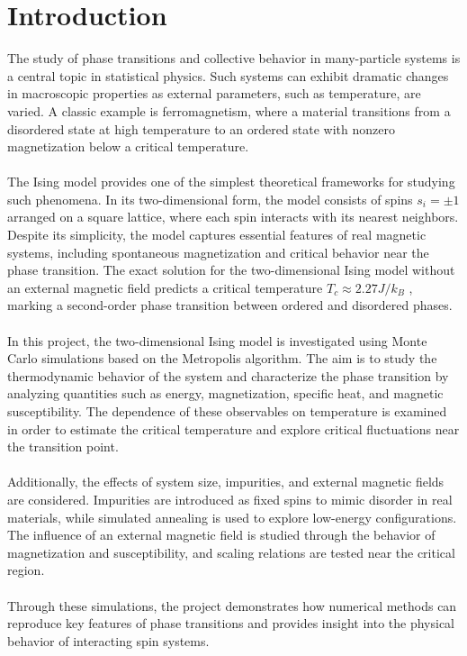 \section{Introduction}


The study of phase transitions and collective behavior in many-particle systems is a central topic in statistical physics. Such systems can exhibit dramatic changes in macroscopic properties as external parameters, such as temperature, are varied. A classic example is ferromagnetism, where a material transitions from a disordered state at high temperature to an ordered state with nonzero magnetization below a critical temperature.
\\ \\
The Ising model provides one of the simplest theoretical frameworks for studying such phenomena. In its two-dimensional form, the model consists of spins 
$ s_i = \pm 1$
arranged on a square lattice, where each spin interacts with its nearest neighbors. Despite its simplicity, the model captures essential features of real magnetic systems, including spontaneous magnetization and critical behavior near the phase transition. The exact solution for the two-dimensional Ising model without an external magnetic field predicts a critical temperature 
$T_c \approx 2.27 J/k_B$
, marking a second-order phase transition between ordered and disordered phases.
\\ \\
In this project, the two-dimensional Ising model is investigated using Monte Carlo simulations based on the Metropolis algorithm. The aim is to study the thermodynamic behavior of the system and characterize the phase transition by analyzing quantities such as energy, magnetization, specific heat, and magnetic susceptibility. The dependence of these observables on temperature is examined in order to estimate the critical temperature and explore critical fluctuations near the transition point.
\\ \\
Additionally, the effects of system size, impurities, and external magnetic fields are considered. Impurities are introduced as fixed spins to mimic disorder in real materials, while simulated annealing is used to explore low-energy configurations. The influence of an external magnetic field is studied through the behavior of magnetization and susceptibility, and scaling relations are tested near the critical region.
\\ \\
Through these simulations, the project demonstrates how numerical methods can reproduce key features of phase transitions and provides insight into the physical behavior of interacting spin systems.
